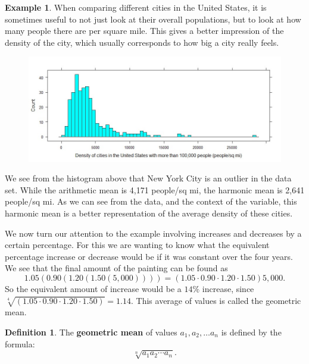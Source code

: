 \documentclass[
]{book}
\theoremstyle{definition}
\newtheorem{definition}{Definition}[chapter]
\theoremstyle{definition}
\newtheorem{example}{Example}[chapter]
\theoremstyle{definition}
\theoremstyle{definition}
\theoremstyle{remark}
\begin{document}
\begin{example}

When comparing different cities in the United States, it is sometimes useful to not just look at their overall populations, but to look at how many people there are per square mile. This gives a better impression of the density of the city, which usually corresponds to how big a city really feels.\\

\begin{figure}

{\centering \includegraphics[width=0.98\linewidth]{images/city_density} 

}

\end{figure}

We see from the histogram above that New York City is an outlier in the data set. While the arithmetic mean is 4,171 people/sq mi, the harmonic mean is 2,641 people/sq mi. As we can see from the data, and the context of the variable, this harmonic mean is a better representation of the average density of these cities.

\end{example}

We now turn our attention to the example involving increases and decreases by a certain percentage. For this we are wanting to know what the equivalent percentage increase or decrease would be if it was constant over the four years. We see that the final amount of the painting can be found as
\[1.05(0.90(1.20(1.50(5,000))))= \left( 1.05 \cdot 0.90 \cdot 1.20 \cdot 1.50\right) 5,000.\] So the equivalent amount of increase would be a \(14\%\) increase, since \(\sqrt[4]{\left( 1.05 \cdot 0.90 \cdot 1.20 \cdot 1.50\right)}=1.14\). This average of values is called the geometric mean.

\begin{definition}
The \textbf{geometric mean} of values \(a_1, a_2, \ldots a_n\) is defined by the formula:
\[\sqrt[n]{a_1 a_2 \cdots a_n}.\]
\end{definition}
\end{document}
